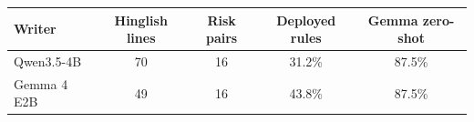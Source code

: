 \begin{tabularx}{\linewidth}{@{}Ycccc@{}}
\toprule
Writer & Hinglish lines & Risk pairs & Deployed rules & Gemma zero-shot\\
\midrule
Qwen3.5-4B & 70 & 16 & 31.2\% & 87.5\%\\
Gemma 4 E2B & 49 & 16 & 43.8\% & 87.5\%\\
\bottomrule
\end{tabularx}
